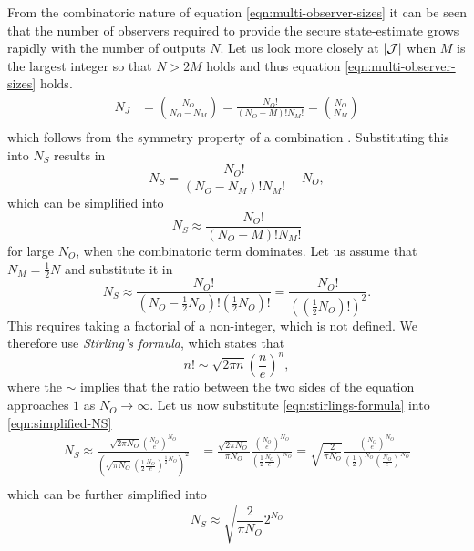 From the combinatoric nature of equation \eqref{eqn:multi-observer-sizes} it can be seen that the number of observers required to provide the secure state-estimate grows rapidly with the number of outputs $N$. Let us look more closely at $|\mathcal{J}|$ when $M$ is the largest integer so that $N>2M$ holds and thus equation \eqref{eqn:multi-observer-sizes} holds.
\begin{equation*}
    \begin{split}
        N_J &= {N_O \choose N_O-N_M}  = \frac{N_O!}{(N_O-M)!N_M!} = {N_O \choose N_M} \\
    \end{split}
\end{equation*}
which follows from the symmetry property of a combination \cite[Section 1.1]{Mazur2010PrinciplesCombinatorics}. Substituting this into $N_S$ results in
\begin{equation*}
    N_S = \frac{N_O!}{(N_O-N_M)!N_M!} + N_O,
\end{equation*}
which can be simplified into
\begin{equation*}
    N_S \approx \frac{N_O!}{(N_O-M)!N_M!}
\end{equation*}
for large $N_O$, when the combinatoric term dominates. Let us assume that $N_M=\frac{1}{2}N$ and substitute it in
\begin{equation}\label{eqn:simplified-NS}
    N_S \approx \frac{N_O!}{(N_O-\frac{1}{2}N_O)!(\frac{1}{2}N_O)!} = \frac{N_O!}{\left( \left( \frac{1}{2}N_O \right) ! \right)^2}.
\end{equation}
This requires taking a factorial of a non-integer, which is not defined. We therefore use \textit{Stirling's formula}\cite{Beals2012GammaZeta}, which states that
\begin{equation}\label{eqn:stirlings-formula}
    n! \sim \sqrt{2\pi n} \left( \frac{n}{e} \right)^n,
\end{equation}
where the $\sim$ implies that the ratio between the two sides of the equation approaches $1$ as $N_O \rightarrow \infty$. Let us now substitute \eqref{eqn:stirlings-formula} into \eqref{eqn:simplified-NS}
\begin{equation*}
    \begin{split}
        N_S \approx  \frac{\sqrt{2 \pi N_O}( \frac{N_O}{e} )^{N_O}}{\left( \sqrt{\pi N_O}(\frac{1}{2} \frac{N_O}{e} )^{\frac{1}{2}N_O} \right)^2} &= \frac{\sqrt{2 \pi N_O}}{\pi N_O} \frac{( \frac{N_O}{e} )^{N_O}}{(\frac{1}{2} \frac{N_O}{e} )^{N_O}} = \sqrt{\frac{2}{\pi N_O}} \frac{( \frac{N_O}{e} )^{N_O}}{(\frac{1}{2})^{N_O} (\frac{N_O}{e} )^{N_O}} \\
    \end{split}
\end{equation*}
which can be further simplified into
\begin{equation}\label{eqn:NS-approximation}
    N_S \approx \sqrt{\frac{2}{\pi N_O}}2^{N_O}
\end{equation}